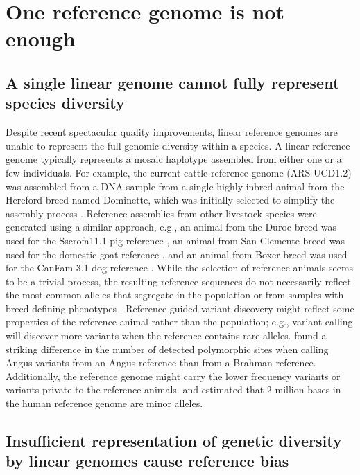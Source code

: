 \documentclass[../main.tex]{subfiles}
\begin{document}
\section{One reference genome is not enough}

\subsection*{A single linear genome cannot fully represent species diversity}

Despite recent spectacular quality improvements, linear reference genomes are unable to represent the full genomic diversity within a species. A linear reference genome typically represents a mosaic haplotype assembled from either one or a few individuals. For example, the current cattle reference genome (ARS-UCD1.2) was assembled from a DNA sample from a single highly-inbred animal from the Hereford breed named Dominette, which was initially selected to simplify the assembly process \citep{rosen2020novo}. Reference assemblies from  other livestock species were generated using a similar approach, e.g., an animal from the Duroc breed was used for the Sscrofa11.1 pig reference \citep{warr2020improved}, an animal from San Clemente breed was used for the domestic goat reference \citep{bickhart2017single}, and an animal from Boxer breed was used for the  CanFam 3.1 dog reference \citep{lindblad2005genome}. While the selection of reference animals seems to be a trivial process, the resulting reference sequences do not necessarily reflect the most common alleles that segregate in the population or from samples with breed-defining phenotypes \citep{ballouz2019time}. Reference-guided variant discovery might reflect some properties of the reference animal rather than the population; e.g., variant calling will discover more variants when the reference contains rare alleles. \citet{Low2020} found a striking difference in the number of detected polymorphic sites when calling Angus variants from an Angus reference than from a Brahman reference. Additionally, the reference genome might carry the lower frequency variants or variants private to the reference animals. \citet{shukla2019hg19kindel} and \citet{ballouz2019time} estimated that 2 million bases in the human reference genome are minor alleles. 

\subsection*{Insufficient representation of genetic diversity by linear genomes cause reference bias}
\end{document}

